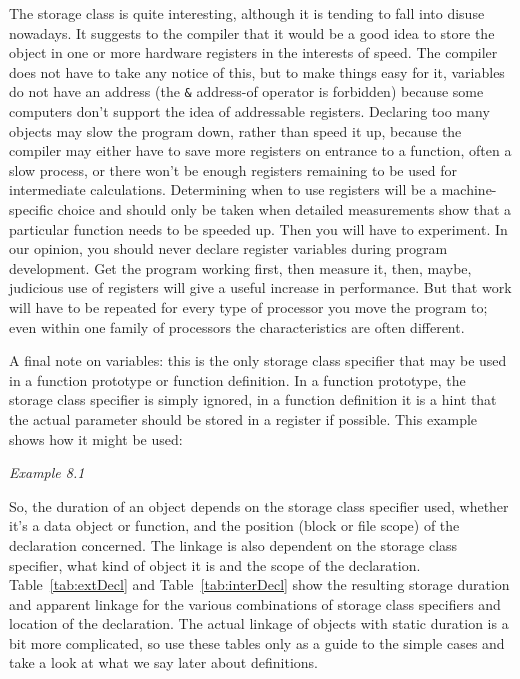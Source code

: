     The \register{} storage class is quite interesting,
     although it is tending to fall into disuse nowadays. It suggests to the
     compiler that it would be a good idea to store the object in one or
     more hardware registers in the interests of speed. The compiler does
     not have to take any notice of this, but to make things easy for it,
     \register{} variables do not have an address (the
     \texttt{\&} address-of operator is forbidden) because some
     computers don't support the idea of addressable registers. Declaring
     too many \register{} objects may slow the program down,
     rather than speed it up, because the compiler may either have to save
     more registers on entrance to a function, often a slow process, or
     there won't be enough registers remaining to be used for intermediate
     calculations. Determining when to use registers will be
     a machine-specific choice and should only be taken when detailed
     measurements show that a particular function needs to be speeded up.
     Then you will have to experiment. In our opinion, you should never
     declare register variables during program development. Get the program
     working first, then measure it, then, maybe, judicious use of registers
     will give a useful increase in performance. But that work will have to
     be repeated for every type of processor you move the program to; even
     within one family of processors the characteristics are often
     different.


    A final note on \register{} variables: this is the only
     storage class specifier that may be used in a function prototype or
     function definition. In a function prototype, the storage class
     specifier is simply ignored, in a function definition it is a hint that
     the actual parameter should be stored in a register if possible. This
     example shows how it might be used:


     \begin{center}\textit{Example 8.1}\end{center}


    So, the duration of an object depends on the storage class specifier
     used, whether it's a data object or function, and the position (block
     or file scope) of the declaration concerned. The linkage is also
     dependent on the storage class specifier, what kind of object it is and
     the scope of the declaration.
     Table~\ref{tab:extDecl} and Table~\ref{tab:interDecl}
     show the resulting storage duration and apparent linkage
     for the various combinations of storage class specifiers and location
     of the declaration. The actual linkage of objects with static duration
     is a bit more complicated, so use these tables only as a guide to the
     simple cases and take a look at what we say later about
     definitions.


